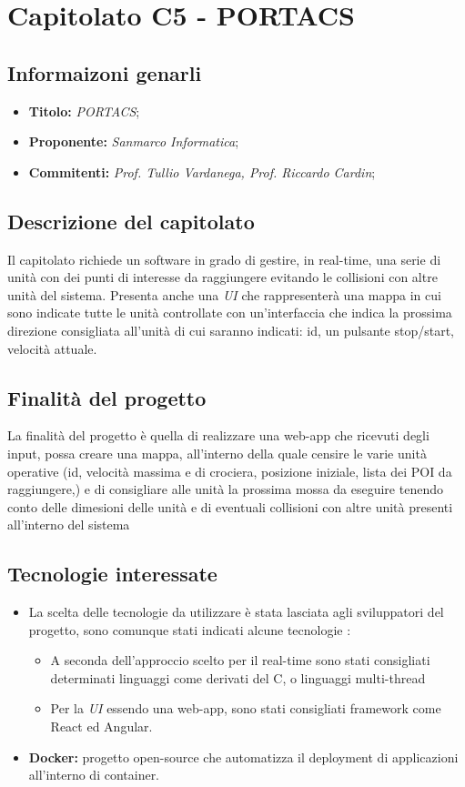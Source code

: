 \section{Capitolato C5 - PORTACS}
\subsection{Informaizoni genarli}
\begin{itemize}
    \item \textbf{Titolo:} \textit{PORTACS};
    \item \textbf{Proponente:} \textit{Sanmarco Informatica};
    \item \textbf{Commitenti:} \textit{Prof. Tullio Vardanega, Prof. Riccardo Cardin};
\end{itemize}
\subsection{Descrizione del capitolato}
Il capitolato richiede un software in grado di gestire, in real-time, una serie di unità con dei punti di interesse da raggiungere evitando le collisioni con altre unità del sistema. 
Presenta anche una \textit{UI} che rappresenterà una mappa in cui sono indicate tutte le unità controllate con un'interfaccia che indica la prossima direzione consigliata 
all'unità di cui saranno indicati: id, un pulsante stop/start, velocità attuale.
\subsection{Finalità del progetto}
La finalità del progetto è quella di realizzare una web-app che ricevuti degli input, possa creare una mappa, all'interno della quale censire le varie unità operative 
(id, velocità massima e di crociera, posizione iniziale, lista dei POI da raggiungere,) e di consigliare 
alle unità la prossima mossa da eseguire tenendo conto delle dimesioni delle unità e di eventuali collisioni con altre unità presenti all'interno del sistema 
\subsection{Tecnologie interessate}
\begin{itemize}
    \item La scelta delle tecnologie da utilizzare è stata lasciata agli sviluppatori del progetto, sono comunque stati indicati alcune tecnologie :
    \begin{itemize}
        \item A seconda dell'approccio scelto per il real-time sono stati consigliati determinati linguaggi come derivati del C, o linguaggi multi-thread
        \item Per la \textit{UI} essendo una web-app, sono stati consigliati framework come React ed Angular.
    \end{itemize}
    \item \textbf{Docker:} progetto open-source che automatizza il deployment di applicazioni all’interno di container.
\end{itemize}
